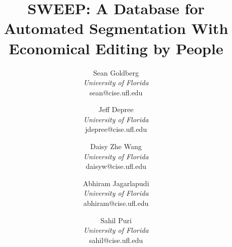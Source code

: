\documentclass[twocolumn,letter]{vldb}
\title{SWEEP: A Database for Automated Segmentation With Economical Editing by People}
\author{Sean Goldberg\\
	{\it University of Florida}\\
	sean@cise.ufl.edu 
\and 
	Jeff Depree\\
	{\it University of Florida}\\
	jdepree@cise.ufl.edu
\and 
	Daisy Zhe Wang\\
	{\it University of Florida}\\
	daisyw@cise.ufl.edu
\and
	Abhiram Jagarlapudi\\
	{\it University of Florida}\\
	abhiram@cise.ufl.edu
\and
	Sahil Puri\\
	{\it University of Florida}\\
	sahil@cise.ufl.edu}
\begin{document}
\maketitle
























\balance
%


\end{document}
